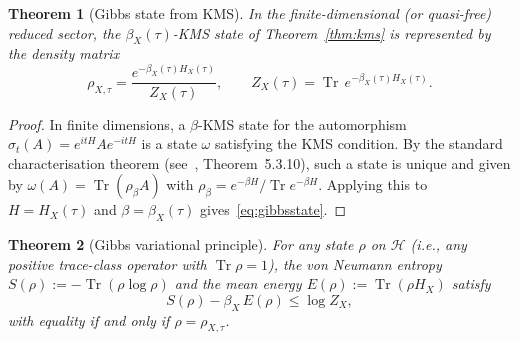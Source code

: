 \documentclass[12pt]{article}
\theoremstyle{plain}
\newtheorem{theorem}{Theorem}[section]
\theoremstyle{definition}
\numberwithin{equation}{section}
\DeclareMathOperator{\Tr}{Tr}
\begin{document}
\begin{theorem}[Gibbs state from KMS]\label{thm:gibbs}
In the finite-dimensional (or quasi-free) reduced sector, the
$\beta_X(\tau)$-KMS state of Theorem~\ref{thm:kms} is represented
by the density matrix
\begin{equation}\label{eq:gibbsstate}
\rho_{X,\tau} = \frac{e^{-\beta_X(\tau)H_X(\tau)}}{Z_X(\tau)},
\qquad
Z_X(\tau) = \Tr\,e^{-\beta_X(\tau)H_X(\tau)}.
\end{equation}
\end{theorem}

\begin{proof}
In finite dimensions, a $\beta$-KMS state for the automorphism
$\sigma_t(A)=e^{itH}Ae^{-itH}$ is a state $\omega$ satisfying
the KMS condition.  By the standard characterisation theorem
(see~\cite{BratteliRobinson}, Theorem~5.3.10), such a state is
unique and given by $\omega(A)=\Tr(\rho_\beta A)$ with
$\rho_\beta=e^{-\beta H}/\Tr e^{-\beta H}$.  Applying this to
$H=H_X(\tau)$ and $\beta=\beta_X(\tau)$ gives~\eqref{eq:gibbsstate}.
\end{proof}

\begin{theorem}[Gibbs variational principle]\label{thm:gibbsvar}
For any state $\rho$ on $\mathcal{H}$ (i.e., any positive
trace-class operator with $\Tr\rho=1$), the von Neumann entropy
$S(\rho):=-\Tr(\rho\log\rho)$ and the mean energy
$E(\rho):=\Tr(\rho H_X)$ satisfy
\begin{equation}\label{eq:variational}
S(\rho)-\beta_X\,E(\rho) \leq \log Z_X,
\end{equation}
with equality if and only if $\rho=\rho_{X,\tau}$.
\end{theorem}
\end{document}
